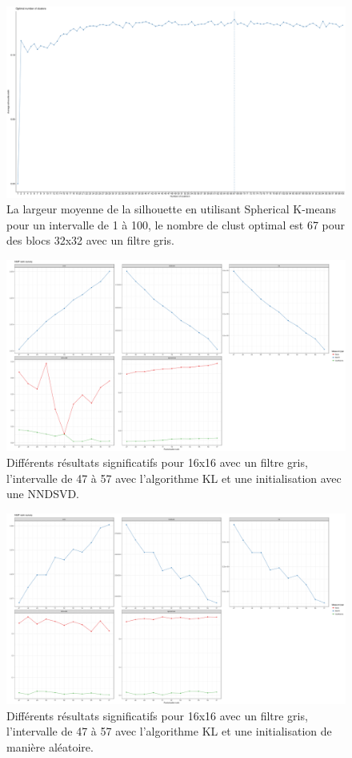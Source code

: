 \documentclass[runningheads]{llncs}
\begin{document}
\begin{figure}
\includegraphics[width=\textwidth]{x32_sk_greyscale.png}
\caption{La largeur moyenne de la silhouette en utilisant Spherical K-means pour un intervalle de 1 \`a 100, le nombre de clust optimal est 67 pour des blocs 32x32 avec un filtre gris.} \label{fig5}
\end{figure}

\begin{figure}
\includegraphics[width=\textwidth]{nmf-16-greyscale-47-57-KL-nndsvd.png}
\caption{Différents r\'esultats significatifs pour 16x16 avec un filtre gris, l'intervalle de 47 à 57 avec l'algorithme KL et une initialisation avec une NNDSVD.} \label{fig6}
\end{figure}

\begin{figure}
\includegraphics[width=\textwidth]{nmf-16-greyscale-47-57-KL-random.png}
\caption{Différents r\'esultats significatifs pour 16x16 avec un filtre gris, l'intervalle de 47 à 57 avec l'algorithme KL et une initialisation de manière aléatoire.} \label{fig6}
\end{figure}
\end{document}
